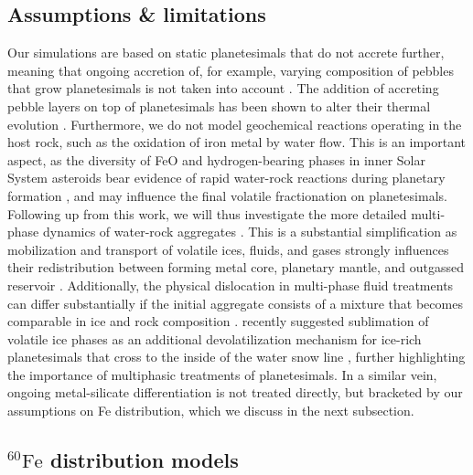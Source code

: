 \documentclass[fleqn,usenatbib]{mnras}
\newcommand{\atom}[2]{$^{#2}\text{#1}$}
\newcommand{\fe}{\atom{Fe}{60}}
\begin{document}
\subsection{Assumptions \& limitations}
\label{sec:assumptions}

Our simulations are based on static planetesimals that do not accrete further, meaning that ongoing accretion of, for example, varying composition of pebbles that grow planetesimals is not taken into account \citep{2021Sci...371..365L,2023A&A...671A..74J}. The addition of accreting pebble layers on top of planetesimals has been shown to alter their thermal evolution \citep{2022Icar..38515100S}. Furthermore, we do not model geochemical reactions operating in the host rock, such as the oxidation of iron metal by water flow. This is an important aspect, as the diversity of FeO and hydrogen-bearing phases in inner Solar System asteroids bear evidence of rapid water-rock reactions during planetary formation \citep{2017RSPTA.37560209S,2018SSRv..214...39M,2019E&PSL.52615771M,grant2023bulk}, and may influence the final volatile fractionation on planetesimals. Following up from this work, we will thus investigate the more detailed multi-phase dynamics of water-rock aggregates \citep{2005E&PSL.240..234T,2017SciA....3E2514B}. This is a substantial simplification as mobilization and transport of volatile ices, fluids, and gases strongly influences their redistribution between forming metal core, planetary mantle, and outgassed reservoir \citep{suer2023_frontearthsci}. Additionally, the physical dislocation in multi-phase fluid treatments can differ substantially if the initial aggregate consists of a mixture that becomes comparable in ice and rock composition \citep{gerya2019introduction}. \citet{2023ApJ...956L..25Z} recently suggested sublimation of volatile ice phases as an additional devolatilization mechanism for ice-rich planetesimals that cross to the inside of the water snow line \citep[due to the snow line migrating outwards during the Class I stage of the solar protoplanetary disk,][]{2021Sci...371..365L}, further highlighting the importance of multiphasic treatments of planetesimals. In a similar vein, ongoing metal-silicate differentiation is not treated directly, but bracketed by our assumptions on Fe distribution, which we discuss in the next subsection.

\subsection{\fe{} distribution models}
\end{document}
